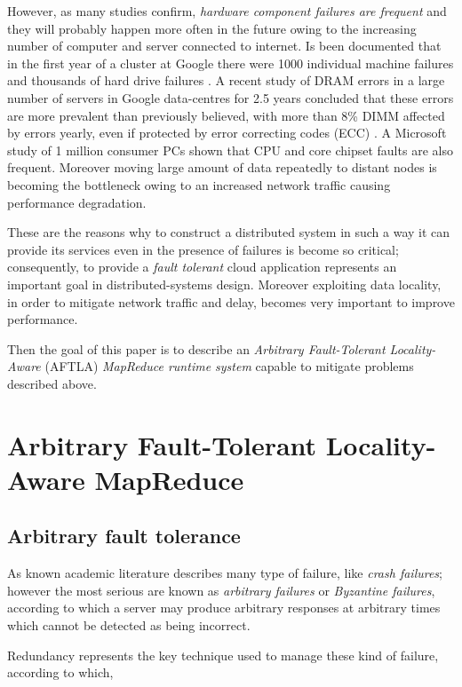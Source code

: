 \documentclass[sigchi]{acmart}
\begin{document}
However, as many studies confirm, \textit{hardware component failures are frequent} and they will probably happen more often in the future owing to the increasing number of computer and server connected to internet. Is been documented that in the first year of a cluster at Google there were 1000 individual machine failures and thousands of hard drive failures \cite{PetaScaleFailure}. A recent study of DRAM errors in a large number of servers in Google data-centres for 2.5 years concluded that these errors are more prevalent than previously believed, with more than 8\% DIMM affected by errors yearly, even if protected by error correcting codes (ECC) \cite{DRAMError}. A Microsoft study of 1 million consumer PCs shown that CPU and core chipset faults are also frequent. \cite{MicrosoftStudyFailure} Moreover moving large amount of data repeatedly to distant nodes is becoming the bottleneck owing to an increased network traffic causing performance degradation.

These are the reasons why to construct a distributed system in such a way it can provide its services even in the presence of failures is become so critical; consequently, to provide a \textit{fault tolerant} cloud application represents an important goal in distributed-systems design. Moreover exploiting data locality, in order to mitigate network traffic and delay, becomes very important to improve performance.

Then the goal of this paper is to describe an \textit{Arbitrary Fault-Tolerant Locality-Aware} (AFTLA) \textit{MapReduce runtime system} capable to mitigate problems described above. 

\section{Arbitrary Fault-Tolerant Locality-Aware MapReduce}

\subsection{Arbitrary fault tolerance}

As known academic literature describes many type of failure, like \textit{crash failures}; however the most serious are known as \textit{arbitrary failures} or \textit{Byzantine failures}, according to which a server may produce arbitrary responses at arbitrary times which cannot be detected as being incorrect. 

Redundancy represents the key technique used to manage these kind of failure, according to which, 
\end{document}
